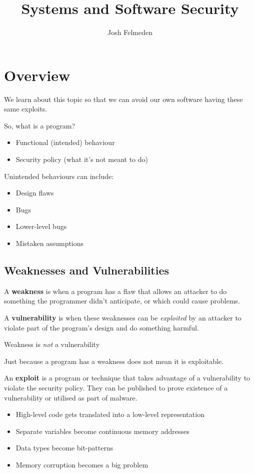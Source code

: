 \documentclass[11pt,a4paper,titlepage,dvipsnames,cmyk]{scrartcl}
\title{Systems and Software Security}
\author{Josh Felmeden}
\begin{document}
\maketitle
\tableofcontents
\newpage
\section{Overview}
We learn about this topic so that we can avoid our own software having these same exploits.

So, what is a program?
\begin{itemize}
    \item Functional (intended) behaviour
    \item Security policy (what it's not meant to do)
\end{itemize}

Unintended behaviours can include:
\begin{itemize}
    \item Design flaws
    \item Bugs
    \item Lower-level bugs
    \item Mistaken assumptions
\end{itemize}

\subsection{Weaknesses and Vulnerabilities}
A \textbf{weakness} is when a program has a flaw that allows an attacker to do something the programmer didn't anticipate, or which could cause problems.

A \textbf{vulnerability} is when these weaknesses can be \textit{exploited} by an attacker to violate part of the program's design and do something harmful.

\begin{tcolorbox}
    \begin{center}
        Weakness is \textit{not} a vulnerability
    \end{center}
\end{tcolorbox}

Just because a program has a weakness does not mean it is exploitable.

An \textbf{exploit} is a program or technique that takes advantage of a vulnerability to violate the security policy. They can be published to prove existence of a vulnerability or utilised as part of malware.

\begin{itemize}
    \item High-level code gets translated into a low-level representation
    \item Separate variables become continuous memory addresses
    \item Data types become bit-patterns
    \item Memory corruption becomes a big problem
\end{itemize}
\end{document}

